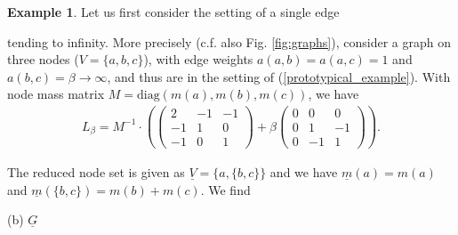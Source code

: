 \documentclass[reqno,12pt,letterpaper]{amsart}
\numberwithin{equation}{section}
\newcommand{\1}{\mathds{1}}
\theoremstyle{definition}
\newtheorem{Ex}[Th]{Example}
\begin{document}
	\begin{Ex}\label{one_edge_div}	Let us first consider the setting of a single edge\\
\noindent		\begin{minipage}[b]{0.7\textwidth}
 tending to infinity. More  
 precisely (c.f. also Fig. \ref{fig:graphs}), consider a graph on three nodes ($V = \{a,b,c\}$), with edge weights  $a(a,b) = a(a,c) = 1$ and $a(b,c) = \beta \rightarrow \infty$, and thus are in the setting of (\ref{prototypical_example}). 
With node mass matrix $M =  \text{diag}(m(a), m(b), m(c))$, we have
\begin{align}\label{und_one_edge_div_laplacian}
	L_\beta =
	M^{-1}
	\cdot 	
	\left(
	\begin{pmatrix}
		2 & -1 & -1 \\
		-1 &1 & 0 \\
		-1 & 0 & 1
	\end{pmatrix}
	+ \beta
	\begin{pmatrix}
		0 & 0 & 0 \\
		0&1 & -1 \\
		0 & -1 & 1
	\end{pmatrix}
	\right).
\end{align}

The reduced node set is given as $\underline{V} = \{a, \{b,c\}\}$ and we have $\underline{m}(a) = m(a)$ and  $\underline{m}( \{b,c\}) = m(b) + m(c)$. We find 
\noindent
		\end{minipage}
		\begin{minipage}[b]{0.4\textwidth}
			\centering
			\begin{minipage}[b]{0.6\textwidth}
\raggedleft
			
				\par\vspace{0.5ex}
			\end{minipage}
			\hfill
			\begin{minipage}[b]{0.35\textwidth}
				\raggedright
				\par\vspace{0.5ex}
				(b) $\underline{G}$
			\end{minipage}
			\label{fig:graphs}
		\end{minipage}


\end{Ex}
\end{document}
